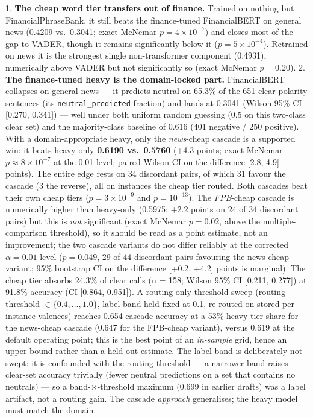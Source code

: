 \documentclass{article}
\begin{document}
1. \textbf{The cheap word tier transfers out of finance.} Trained on nothing but
   FinancialPhraseBank, it still beats the finance-tuned FinancialBERT on
   general news (0.4209 vs.\ 0.3041; exact McNemar $p = 4\times10^{-7}$) and
   closes most of the gap to VADER, though it remains significantly below it
   ($p = 5\times10^{-4}$). Retrained on news it is the strongest single
   non-transformer component (0.4931), numerically above VADER but not
   significantly so (exact McNemar $p = 0.20$).
2. \textbf{The finance-tuned heavy is the domain-locked part.} FinancialBERT
    collapses on general news --- it predicts neutral on 65.3\% of the 651
    clear-polarity sentences (its \texttt{neutral\_predicted} fraction) and lands
    at 0.3041 (Wilson 95\% CI [0.270, 0.341]) --- well under both uniform random
    guessing (0.5 on this two-class clear set) and the majority-class baseline of
    0.616 (401 negative / 250 positive). With a
   domain-appropriate heavy, only the \emph{news}-cheap cascade is a supported
    win: it beats heavy-only \textbf{0.6190 vs.\ 0.5760} (+4.3 points; exact
    McNemar $p \approx 8\times10^{-7}$ at the 0.01 level; paired-Wilson CI on the
    difference [2.8, 4.9] points). The entire edge rests on 34 discordant pairs,
    of which 31 favour the cascade (3 the reverse), all on instances the cheap
    tier routed. Both cascades beat their own cheap tiers
    ($p = 3\times10^{-9}$ and $p = 10^{-13}$). The \emph{FPB}-cheap cascade is
    numerically higher than heavy-only (0.5975; +2.2 points on 24 of 34
    discordant pairs) but this is \emph{not} significant
    (exact McNemar $p = 0.02$, above the multiple-comparison threshold), so it
    should be read as a point estimate, not an improvement; the two cascade
    variants do not differ reliably at the corrected $\alpha = 0.01$ level
    ($p = 0.049$, 29 of 44 discordant pairs favouring the news-cheap variant;
    95\% bootstrap CI on the difference [+0.2, +4.2] points is
    marginal). The cheap tier absorbs 24.3\% of clear calls
    (n = 158; Wilson 95\% CI [0.211, 0.277]) at 91.8\% accuracy (CI [0.864,
    0.951]). A routing-only threshold sweep (routing threshold
    $\in \{0.4,\dots,1.0\}$, label band held fixed at 0.1, re-routed on stored
    per-instance valences) reaches 0.654 cascade accuracy at a 53\% heavy-tier
    share for the news-cheap cascade (0.647 for the FPB-cheap variant), versus
    0.619 at the default operating point; this is the best point of an
    \emph{in-sample} grid, hence an upper bound rather than a held-out
    estimate. The label band is deliberately not swept: it is confounded with
    the routing threshold --- a narrower band raises clear-set accuracy
    trivially (fewer neutral predictions on a set that contains no neutrals) ---
    so a band-$\times$-threshold maximum (0.699 in earlier drafts) was a label
    artifact, not a routing gain. The cascade \emph{approach} generalises; the
    heavy model must match the domain.
\end{document}
